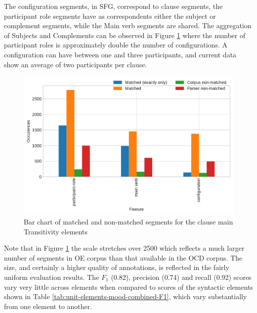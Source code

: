     The configuration segments, in SFG, correspond to clause segments, the participant role segments have as correspondents either the subject or complement segments, while the Main verb segments are shared. The aggregation of Subjects and Complements can be observed in Figure \ref{fig:unit-elements-transitivity-data} where the number of participant roles is approximately double the number of configurations. A configuration can have between one and three participants, and current data show an average of two participants per clause. 
    
    \begin{figure}[!ht]
    \centering
    \includegraphics[width=.85\textwidth]{evaluation-results/figures/unit-elements-transitivity-data.pdf}
    \caption{Bar chart of matched and non-matched segments for the clause main Transitivity elements}
    \label{fig:unit-elements-transitivity-data}
    \end{figure}
    
    Note that in Figure \ref{fig:unit-elements-transitivity-data} the scale stretches over 2500 which reflects a much larger number of segments in OE corpus than that available in the OCD corpus. The size, and certainly a higher quality of annotations, is reflected in the fairly uniform evaluation results. The $F_1$ (0.82), precision (0.74) and recall (0.92) scores vary very little across elements when compared to scores of the syntactic elements shown in Table \ref{tab:unit-elements-mood-combined-F1},  which vary substantially from one element to another.   

